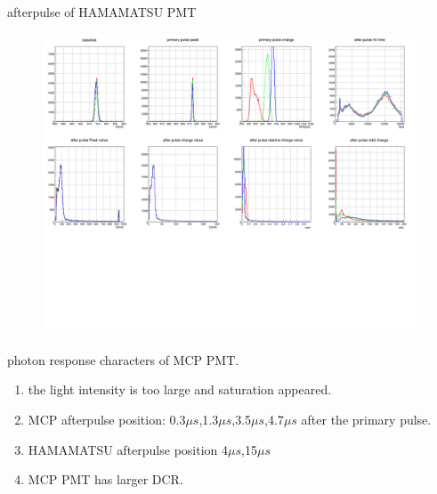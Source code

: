 \documentclass[11pt,compress,xcolor=x11names,UTF8]{beamer}
\begin{document}
\begin{frame}{afterpulse of HAMAMATSU PMT }
\begin{figure}
\centering
	\includegraphics[width=0.99\textwidth]{figure/EA0863_apstats}
\end{figure}

\end{frame}
\begin{frame}{photon response characters of MCP PMT.}
	\begin{enumerate}
	\item the light intensity is too large and saturation appeared.
	\item MCP afterpulse position: 0.3$\mu s$,1.3$\mu s$,3.5$\mu s$,4.7$\mu s$ after the primary pulse.
	\item  HAMAMATSU afterpulse position 4$\mu s$,15$\mu s$
	\item MCP PMT has larger DCR.
	\end{enumerate}
\end{frame}
\end{document}
